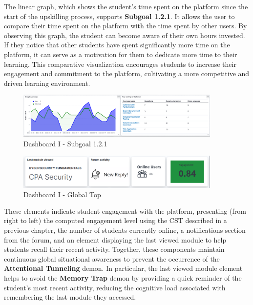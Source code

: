 The linear graph, which shows the student's time spent on the platform since the start of the upskilling process, supports \textbf{Subgoal 1.2.1}. 
It allows the user to compare their time spent on the platform with the time spent by other users. 
By observing this graph, the student can become aware of their own hours invested. 
If they notice that other students have spent significantly more time on the platform, it can serve as a motivation for them to dedicate more time to their learning. 
This comparative visualization encourages students to increase their engagement and commitment to the platform, cultivating a more competitive and driven learning environment.


\begin{figure}[H]
    \centering
    \includegraphics[width=0.9\textwidth]{assets/dashboard_1_121.png}
    \caption{Dashboard I - Subgoal 1.2.1}
    \label{fig:dashboard_1_subgoal_121}
\end{figure}


\begin{figure}[H]
    \centering
    \includegraphics[width=0.9\textwidth]{assets/dashboard_1_globaltop.png}
    \caption{Dashboard I - Global Top}
    \label{fig:dashboard_1_global_top}
\end{figure}

These elements indicate student engagement with the platform, presenting (from right to left) the computed engagement level using the CST described in a previous chapter, the number of students currently online, a notifications section from the forum, and an element displaying the last viewed module to help students recall their recent activity. Together, these components maintain continuous global situational awareness to prevent the occurrence of the \textbf{Attentional Tunneling} demon.
In particular, the last viewed module element helps to avoid the \textbf{Memory Trap} demon by providing a quick reminder of the student's most recent activity, reducing the cognitive load associated with remembering the last module they accessed.

